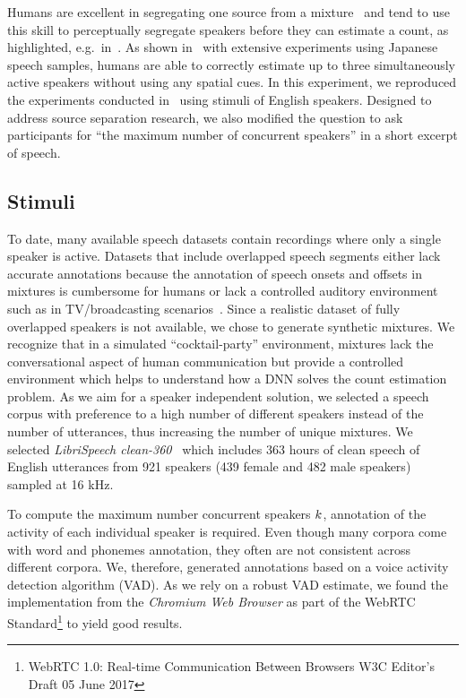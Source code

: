 Humans are excellent in segregating one source from a mixture~\cite{bregman90} and tend to use this skill to perceptually segregate speakers before they can estimate a count, as highlighted, e.g.\ in~\cite{kawashima15}.
As shown in~\cite{kashino96, kawashima15} with extensive experiments using Japanese speech samples, humans are able to correctly estimate up to three simultaneously active speakers without using any spatial cues.
In this experiment, we reproduced the experiments conducted in~\cite{kawashima15, kashino96} using stimuli of English speakers.
Designed to address source separation research, we also modified the question to ask participants for ``the maximum number of concurrent speakers'' in a short excerpt of speech.

\subsection{Stimuli}
To date, many available speech datasets contain recordings where only a single speaker is active.
Datasets that include overlapped speech segments either lack accurate annotations because the annotation of speech onsets and offsets in mixtures is cumbersome for humans or lack a controlled auditory environment such as in TV/broadcasting scenarios~\cite{Gravier12}.
Since a realistic dataset of fully overlapped speakers is not available, we chose to generate synthetic mixtures.
We recognize that in a simulated ``cocktail-party'' environment, mixtures lack the conversational aspect of human communication but provide a controlled environment which helps to understand how a DNN solves the count estimation problem.
As we aim for a speaker independent solution, we selected a speech corpus with preference to a high number of different speakers instead of the number of utterances, thus increasing the number of unique mixtures.
We selected \emph{LibriSpeech clean-360}~\cite{panayotov15} which includes 363 hours of clean speech of English utterances from 921 speakers (439 female and 482 male speakers) sampled at 16 kHz.
\par
To compute the maximum number concurrent speakers \(k\), annotation of the activity of each individual speaker is required.
Even though many corpora come with word and phonemes annotation, they often are not consistent across different corpora.
We, therefore, generated annotations based on a voice activity detection algorithm (VAD). As we rely on a robust VAD estimate, we found the implementation from the \emph{Chromium Web Browser} as part of the WebRTC Standard\footnote{WebRTC 1.0: Real-time Communication Between Browsers W3C Editor's Draft 05 June 2017} to yield good results.
